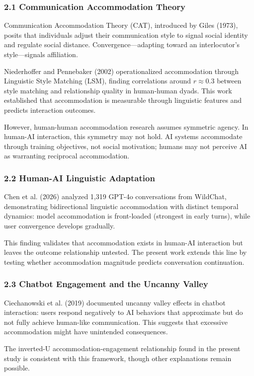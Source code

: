 
\subsubsection{2.1 Communication Accommodation Theory}

Communication Accommodation Theory (CAT), introduced by Giles (1973), posits that individuals adjust their communication style to signal social identity and regulate social distance. Convergence---adapting toward an interlocutor's style---signals affiliation.

Niederhoffer and Pennebaker (2002) operationalized accommodation through Linguistic Style Matching (LSM), finding correlations around $r\approx 0.3$ between style matching and relationship quality in human-human dyads. This work established that accommodation is measurable through linguistic features and predicts interaction outcomes.

However, human-human accommodation research assumes symmetric agency. In human-AI interaction, this symmetry may not hold. AI systems accommodate through training objectives, not social motivation; humans may not perceive AI as warranting reciprocal accommodation.

\subsubsection{2.2 Human-AI Linguistic Adaptation}

Chen et al. (2026) analyzed 1,319 GPT-4o conversations from WildChat, demonstrating bidirectional linguistic accommodation with distinct temporal dynamics: model accommodation is front-loaded (strongest in early turns), while user convergence develops gradually.

This finding validates that accommodation exists in human-AI interaction but leaves the outcome relationship untested. The present work extends this line by testing whether accommodation magnitude predicts conversation continuation.

\subsubsection{2.3 Chatbot Engagement and the Uncanny Valley}

Ciechanowski et al. (2019) documented uncanny valley effects in chatbot interaction: users respond negatively to AI behaviors that approximate but do not fully achieve human-like communication. This suggests that excessive accommodation might have unintended consequences.

The inverted-U accommodation-engagement relationship found in the present study is consistent with this framework, though other explanations remain possible.

